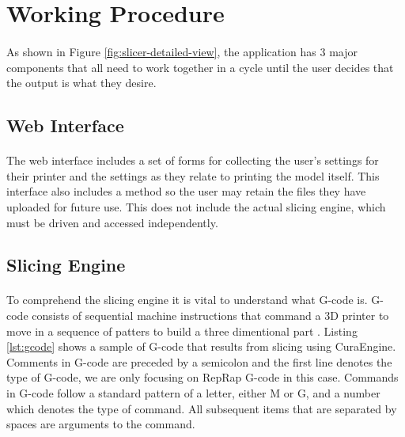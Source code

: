 \section{Working Procedure}
\paragraph{}
As shown in Figure \ref{fig:slicer-detailed-view}, the application has 3 major components that all need to work together in a cycle until the user decides that the output is what they desire.

\subsection{Web Interface}
\paragraph{}
The web interface includes a set of forms for collecting the user's settings for their printer and the settings as they relate to printing the model itself.
This interface also includes a method so the user may retain the files they have uploaded for future use.
This does not include the actual slicing engine, which must be driven and accessed independently.

\subsection{Slicing Engine}
\paragraph{}
To comprehend the slicing engine it is vital to understand what G-code is.
G-code consists of sequential machine instructions that command a 3D printer to move in a sequence of patters to build a three dimentional part \citep{gcode-2012}.
Listing \ref{lst:gcode} shows a sample of G-code that results from slicing using CuraEngine.
Comments in G-code are preceded by a semicolon and the first line denotes the type of G-code, we are only focusing on RepRap G-code in this case.
Commands in G-code follow a standard pattern of a letter, either M or G, and a number which denotes the type of command.
All subsequent items that are separated by spaces are arguments to the command.


